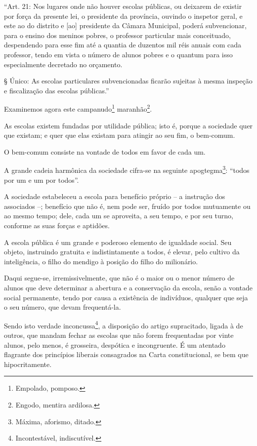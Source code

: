 ``Art. 21: Nos lugares onde não houver escolas públicas, ou deixarem de
existir por força da presente lei, o presidente da província, ouvindo o
inspetor geral, e este ao do distrito e {[}ao{]} presidente da Câmara
Municipal, poderá subvencionar, para o ensino dos meninos pobres, o
professor particular mais conceituado, despendendo para esse fim até a
quantia de duzentos mil réis anuais com cada professor, tendo em vista o
número de alunos pobres e o quantum para isso especialmente decretado no
orçamento.

§ Único: As escolas particulares subvencionadas ficarão sujeitas à mesma
inspeção e fiscalização das escolas públicas.''

Examinemos agora este campanudo\footnote{Empolado, pomposo.}
maranhão\footnote{Engodo, mentira ardilosa.}.

As escolas existem fundadas por utilidade pública; isto é, porque a
sociedade quer que existam; e quer que elas existam para atingir ao seu
fim, o bem-comum.

O bem-comum consiste na vontade de todos em favor de cada um.

A grande cadeia harmônica da sociedade cifra-se na seguinte
apogtegma\footnote{Máxima, aforismo, ditado.}: ``todos por um e um por
todos''.

A sociedade estabeleceu a escola para benefício próprio -- a instrução
dos associados --; benefício que não é, nem pode ser, fruído por todos
mutuamente ou ao mesmo tempo; dele, cada um se aproveita, a seu tempo, e
por seu turno, conforme as suas forças e aptidões.

A escola pública é um grande e poderoso elemento de igualdade social.
Seu objeto, instruindo gratuita e indistintamente a todos, é elevar,
pelo cultivo da inteligência, o filho do mendigo à posição do filho do
milionário.

Daqui segue-se, irremissivelmente, que não é o maior ou o menor número
de alunos que deve determinar a abertura e a conservação da escola,
senão a vontade social permanente, tendo por causa a existência de
indivíduos, qualquer que seja o seu número, que devam frequentá-la.

Sendo isto verdade inconcussa\footnote{Incontestável, indiscutível.},
a disposição do artigo supracitado, ligada à de outros, que mandam
fechar as escolas que não forem frequentadas por vinte alunos, pelo
menos, é grosseira, despótica e incongruente. É um atentado flagrante
dos princípios liberais consagrados na Carta constitucional, se bem que
hipocritamente.

